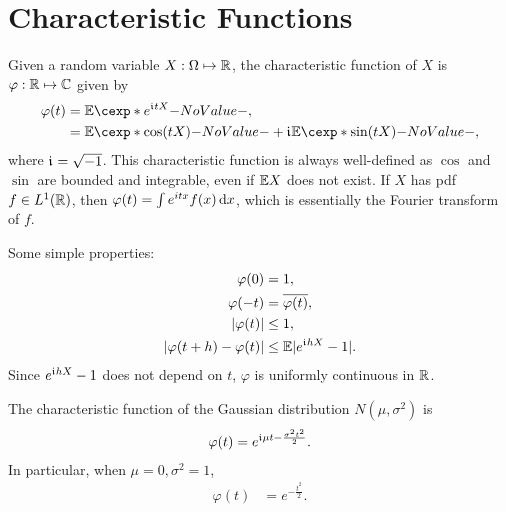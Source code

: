 \documentclass[12pt]{article}
\begin{document}

\section{Characteristic Functions}

Given a random variable $X: \Omega \mapsto \mathbb{R}$, the characteristic function of $X$ is $\varphi : \mathbb{R}\mapsto\mathbb{C}$ given by
\begin{align*}
\varphi(t)&=\E [e^{\iu tX}],\\
&=\E[\cos (tX)]+\iu\E [\sin (tX)],
\end{align*}
where $\mathfrak{i}\mkern1mu=\sqrt{-1}$. This characteristic function is always well-defined as $\cos$ and $\sin$ are bounded and integrable, even if $\E X$ does not exist. If $X$ has pdf $f\in L^1(\mathbb{R})$, then $\varphi(t)=\int e^{itx} f(x) \,\mathrm{d} x$, which is essentially the Fourier transform of $f$. 

Some simple properties:
\begin{align*}
\varphi(0)	& =1,\\
\varphi(-t)	& =\overline{\varphi(t)},\\
|\varphi(t)|	& \leq 1,\\
|\varphi(t+h)-\varphi(t)| 	& \leq \E|e^{\iu hX}-1|.
\end{align*}
Since $e^{\mathfrak{i}\mkern1mu hX}-1$ does not depend on $t$, $\varphi$ is uniformly continuous in $\mathbb{R}$. 

\begin{Example}
The characteristic function of the Gaussian distribution $N(\mu,\sigma^2)$ is
\begin{align*}
\varphi(t)=e^{\mathfrak{i}\mkern1mu \mu t-\frac{\sigma^2t^2}{2}}.
\end{align*}
In particular, when $\mu=0,\sigma^2=1$,
\begin{align*}
\varphi(t)&=e^{-\frac{t^2}{2}}.
\end{align*}
\end{Example}
\end{document}
